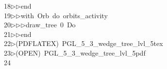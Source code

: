 \begin{tabbing}
18\>$\triangleright$\>$\triangleright$\>end\ \\[0pt]
19\>$\triangleright$\>$\triangleright$\>with\ Orb\ do\ orbits\_activity\ \\[0pt]
20\>$\triangleright$\>$\triangleright$\>$\triangleright$\>draw\_tree\ 0\ Do\ \\[0pt]
21\>$\triangleright$\>$\triangleright$\>end\ \\[0pt]
22\>$\triangleright$\>(PDFLATEX)\ PGL\_5\_3\_wedge\_tree\_lvl\_5tex\\[0pt]
23\>$\triangleright$\>(OPEN)\ PGL\_5\_3\_wedge\_tree\_lvl\_5pdf\\[0pt]
24\>\end{tabbing}
